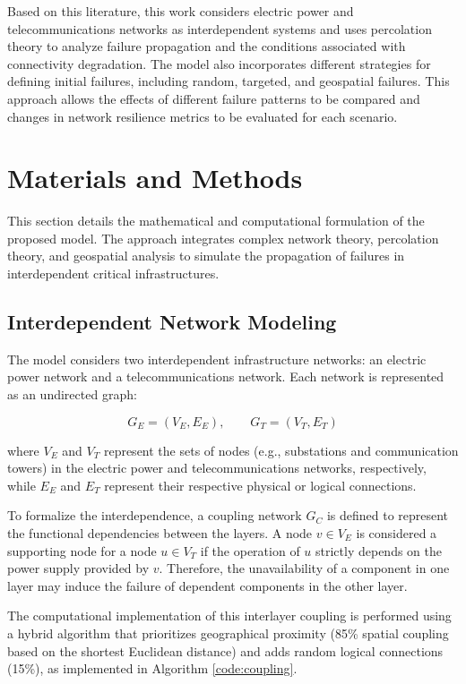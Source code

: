 \documentclass[journal]{IEEEtran}
\begin{document}
Based on this literature, this work considers electric power and telecommunications networks as interdependent systems and uses percolation theory to analyze failure propagation and the conditions associated with connectivity degradation. The model also incorporates different strategies for defining initial failures, including random, targeted, and geospatial failures. This approach allows the effects of different failure patterns to be compared and changes in network resilience metrics to be evaluated for each scenario.

\section{Materials and Methods}
This section details the mathematical and computational formulation of the proposed model. The approach integrates complex network theory, percolation theory, and geospatial analysis to simulate the propagation of failures in interdependent critical infrastructures.


\subsection{Interdependent Network Modeling}
The model considers two interdependent infrastructure networks: an electric power network and a telecommunications network. Each network is represented as an undirected graph:

\begin{equation}
G_E = (V_E, E_E), \qquad G_T = (V_T, E_T)
\label{eq:networks}
\end{equation}

where $V_E$ and $V_T$ represent the sets of nodes (e.g., substations and communication towers) in the electric power and telecommunications networks, respectively, while $E_E$ and $E_T$ represent their respective physical or logical connections.

To formalize the interdependence, a coupling network $G_C$ is defined to represent the functional dependencies between the layers. A node $v \in V_E$ is considered a supporting node for a node $u \in V_T$ if the operation of $u$ strictly depends on the power supply provided by $v$. Therefore, the unavailability of a component in one layer may induce the failure of dependent components in the other layer.


The computational implementation of this interlayer coupling is performed using a hybrid algorithm that prioritizes geographical proximity (85\% spatial coupling based on the shortest Euclidean distance) and adds random logical connections (15\%), as implemented in Algorithm \ref{code:coupling}.
\end{document}
